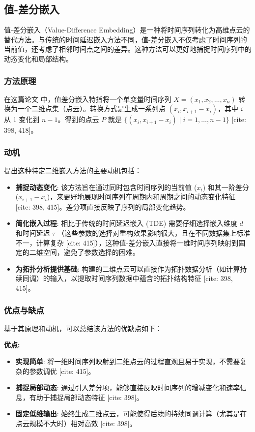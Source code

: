 \subsection{值-差分嵌入}
值-差分嵌入（Value-Difference Embedding）是一种将时间序列转化为高维点云的替代方法。与传统的时间延迟嵌入方法不同，值-差分嵌入不仅考虑了时间序列的当前值，还考虑了相邻时间点之间的差异。这种方法可以更好地捕捉时间序列中的动态变化和局部结构。

\subsubsection{方法原理}
在这篇论文 \cite{Yan2024PHTSI} 中，值差分嵌入特指将一个单变量时间序列 \( X = (x_1, x_2, \dots, x_n) \) 转换为一个二维点集（点云）。转换方式是生成一系列点 \( (x_i, x_{i+1} - x_i) \)，其中 \( i \) 从 1 变化到 \( n-1 \)。得到的点云 \( P \) 就是 \( \{ (x_i, x_{i+1} - x_i) \mid i = 1, \dots, n-1 \} \) [cite: 398, 418]。

\subsubsection{动机}
提出这种特定二维嵌入方法的主要动机包括：
\begin{itemize}
    \item \textbf{捕捉动态变化}: 该方法旨在通过同时包含时间序列的当前值 ($x_i$) 和其一阶差分 ($x_{i+1} - x_i$)，来更好地展现时间序列在周期内和周期之间的动态变化特征 [cite: 398, 415]。差分项直接反映了序列的局部变化趋势。
    \item \textbf{简化嵌入过程}: 相比于传统的时间延迟嵌入 (TDE) 需要仔细选择嵌入维度 $d$ 和时间延迟 $\tau$ （这些参数的选择对重构效果影响很大，且在不同数据集上标准不一，计算复杂 [cite: 415]），这种值-差分嵌入直接将一维时间序列映射到固定的二维空间，避免了参数选择的困难。
    \item \textbf{为拓扑分析提供基础}: 构建的二维点云可以直接作为拓扑数据分析（如计算持续同调）的输入，以提取时间序列数据中蕴含的拓扑结构特征 [cite: 398, 415]。
\end{itemize}

\subsubsection{优点与缺点}
基于其原理和动机，可以总结该方法的优缺点如下：

\textbf{优点:}
\begin{itemize}
    \item \textbf{实现简单}: 将一维时间序列映射到二维点云的过程直观且易于实现，不需要复杂的参数调优 [cite: 415]。
    \item \textbf{捕捉局部动态}: 通过引入差分项，能够直接反映时间序列的增减变化和速率信息，有助于捕捉局部动态特征 [cite: 398]。
    \item \textbf{固定低维输出}: 始终生成二维点云，可能使得后续的持续同调计算（尤其是在点云规模不大时）相对高效 [cite: 398]。
\end{itemize}

